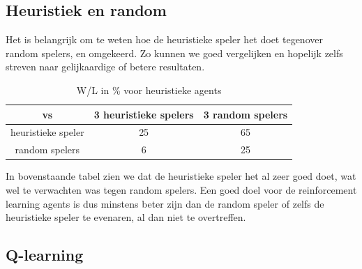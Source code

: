 \documentclass[11pt]{article}
\begin{document}
\subsection{Heuristiek en random}
Het is belangrijk om te weten hoe de heuristieke speler het doet tegenover random spelers, en omgekeerd. Zo kunnen we goed vergelijken en hopelijk zelfs streven naar gelijkaardige of betere resultaten.
\begin{table}[H]
        \centering
        \begin{tabular}{|c|c|c|}
                \hline
                  vs                & 3 heuristieke spelers & 3 random spelers \\
                \hline
                 heuristieke speler & 25         & 65\\
                 random spelers     & 6         & 25\\
                \hline
        \end{tabular}
        \caption{W/L in \% voor heuristieke agents}
\end{table}
\noindent In bovenstaande tabel zien we dat de heuristieke speler het al zeer goed doet, wat wel te verwachten was tegen random spelers. Een goed doel voor de reinforcement learning agents is dus minstens beter zijn dan de random speler of zelfs de heuristieke speler te evenaren, al dan niet te overtreffen.

\subsection{Q-learning}
\end{document}
